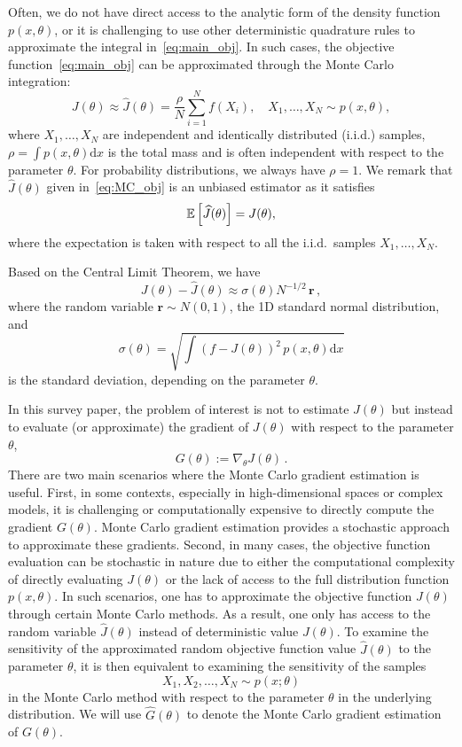\documentclass[12pt]{amsart}
\newcommand{\rd}{\mathrm{d}}
\begin{document}
Often, we do not have direct access to the analytic form of the density function $p(x,\theta)$, or it is challenging to use other deterministic quadrature rules to approximate the integral in~\eqref{eq:main_obj}. In such cases, the objective function~\eqref{eq:main_obj} can be approximated through the Monte Carlo integration:
\begin{equation}\label{eq:MC_obj}
    J(\theta) \approx   \widehat{J}(\theta) = \frac{\rho}{N} \sum_{i=1}^N f(X_i),\quad X_1,\ldots, X_N \sim p(x,\theta),
\end{equation}
where $X_1,\ldots, X_N $  are independent and identically distributed (i.i.d.) samples, $\rho = \int p(x,\theta) \rd x$ is the total mass and is often independent with respect to the parameter $\theta$. For probability distributions, we always have $\rho = 1$. We remark that $\widehat{J}(\theta)$ given in~\eqref{eq:MC_obj} is an unbiased estimator as it satisfies 
$$\mathbb E\left[ \widehat{J}(\theta) \right] = J(\theta),$$
where the expectation is taken with respect to all the i.i.d.~samples $X_1,\ldots, X_N$. 

Based on the Central Limit Theorem, we have~\cite{caflisch1998monte}
\[
J(\theta)  - \widehat{J}(\theta)  \approx \sigma(\theta) N^{-1/2} \, \mathbf{r}\,,
\]
where the random variable $\mathbf{r}\sim N(0,1)$, the 1D standard normal distribution, and $$\sigma(\theta) = \sqrt{\int \left(f - J(\theta) \right)^2 \, p(x,\theta) \rd x}$$ 
is the standard deviation, depending on the parameter $\theta$.

In this survey paper, the problem of interest is not to estimate $J(\theta) $ but instead to evaluate (or approximate) the gradient of $J(\theta)$ with respect to the parameter $\theta$, 
\begin{equation}\label{eq:true_grad}
G(\theta) := \nabla_\theta J(\theta)\,.
\end{equation}
There are two main scenarios where the Monte Carlo gradient estimation is useful. First, in some contexts, especially in high-dimensional spaces or complex models, it is challenging or computationally expensive to directly compute the gradient $G(\theta)$. Monte Carlo gradient estimation provides a stochastic approach to approximate these gradients. Second, in many cases, the objective function evaluation can be stochastic in nature due to either the computational complexity of directly evaluating $J(\theta)$  or the lack of access to the full distribution function $p(x,\theta)$. In such scenarios, one has to approximate the objective function $J(\theta)$  through certain Monte Carlo methods. As a result, one only has access to the random variable $\widehat{J}(\theta)$ instead of deterministic value $J(\theta)$. To examine the sensitivity of the approximated random objective function value $\widehat{J}(\theta)$ to the parameter $\theta$, it is then equivalent to examining the sensitivity of the samples 
$$
X_1,X_2,\ldots, X_N \sim p(x;\theta)
$$
in the Monte Carlo method with respect to the parameter $\theta$ in the underlying distribution. We will use $\widehat{G}(\theta)$ to denote the Monte Carlo gradient estimation of $G(\theta)$.
\end{document}

